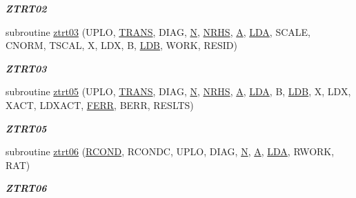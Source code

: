 \begin{DoxyCompactItemize}
\begin{DoxyCompactList}\small\item\em {\bfseries Z\+T\+R\+T02} \end{DoxyCompactList}\item 
subroutine \hyperlink{group__complex16__lin_ga7af5969e990c7da14aaab7350e173b78}{ztrt03} (U\+P\+L\+O, \hyperlink{superlu__enum__consts_8h_a0c4e17b2d5cea33f9991ccc6a6678d62a1f61e3015bfe0f0c2c3fda4c5a0cdf58}{T\+R\+A\+N\+S}, D\+I\+A\+G, \hyperlink{polmisc_8c_a0240ac851181b84ac374872dc5434ee4}{N}, \hyperlink{example__user_8c_aa0138da002ce2a90360df2f521eb3198}{N\+R\+H\+S}, \hyperlink{classA}{A}, \hyperlink{example__user_8c_ae946da542ce0db94dced19b2ecefd1aa}{L\+D\+A}, S\+C\+A\+L\+E, C\+N\+O\+R\+M, T\+S\+C\+A\+L, X, L\+D\+X, B, \hyperlink{example__user_8c_a50e90a7104df172b5a89a06c47fcca04}{L\+D\+B}, W\+O\+R\+K, R\+E\+S\+I\+D)
\begin{DoxyCompactList}\small\item\em {\bfseries Z\+T\+R\+T03} \end{DoxyCompactList}\item 
subroutine \hyperlink{group__complex16__lin_gab744440a1bee3f80ae5d975e82cf5e38}{ztrt05} (U\+P\+L\+O, \hyperlink{superlu__enum__consts_8h_a0c4e17b2d5cea33f9991ccc6a6678d62a1f61e3015bfe0f0c2c3fda4c5a0cdf58}{T\+R\+A\+N\+S}, D\+I\+A\+G, \hyperlink{polmisc_8c_a0240ac851181b84ac374872dc5434ee4}{N}, \hyperlink{example__user_8c_aa0138da002ce2a90360df2f521eb3198}{N\+R\+H\+S}, \hyperlink{classA}{A}, \hyperlink{example__user_8c_ae946da542ce0db94dced19b2ecefd1aa}{L\+D\+A}, B, \hyperlink{example__user_8c_a50e90a7104df172b5a89a06c47fcca04}{L\+D\+B}, X, L\+D\+X, X\+A\+C\+T, L\+D\+X\+A\+C\+T, \hyperlink{superlu__enum__consts_8h_af00a42ecad444bbda75cde1b64bd7e72a78fd14d7abebae04095cfbe02928f153}{F\+E\+R\+R}, B\+E\+R\+R, R\+E\+S\+L\+T\+S)
\begin{DoxyCompactList}\small\item\em {\bfseries Z\+T\+R\+T05} \end{DoxyCompactList}\item 
subroutine \hyperlink{group__complex16__lin_ga638e863c0fdeffaa6caaa4485eae55cd}{ztrt06} (\hyperlink{superlu__enum__consts_8h_af00a42ecad444bbda75cde1b64bd7e72a9b5c151728d8512307565994c89919d5}{R\+C\+O\+N\+D}, R\+C\+O\+N\+D\+C, U\+P\+L\+O, D\+I\+A\+G, \hyperlink{polmisc_8c_a0240ac851181b84ac374872dc5434ee4}{N}, \hyperlink{classA}{A}, \hyperlink{example__user_8c_ae946da542ce0db94dced19b2ecefd1aa}{L\+D\+A}, R\+W\+O\+R\+K, R\+A\+T)
\begin{DoxyCompactList}\small\item\em {\bfseries Z\+T\+R\+T06} \end{DoxyCompactList}\item 

\end{DoxyCompactItemize}
